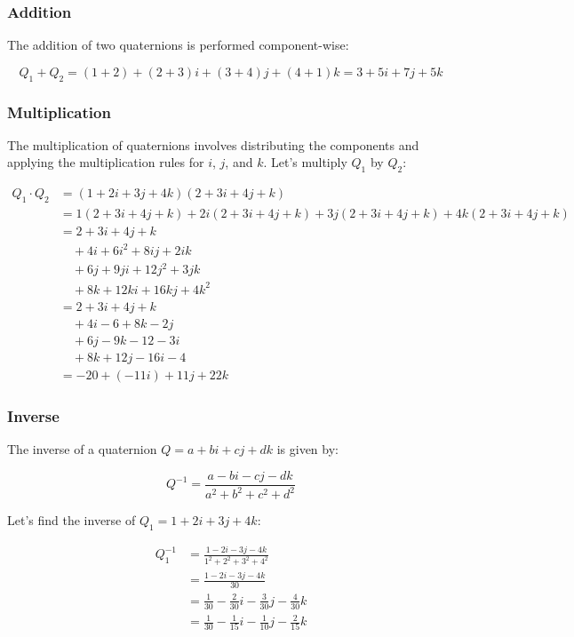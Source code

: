 \documentclass[
]{article}
\begin{document}
\subsubsection{Addition}\label{addition}

The addition of two quaternions is performed component-wise:

\[ Q_1 + Q_2 = (1 + 2) + (2 + 3)i + (3 + 4)j + (4 + 1)k = 3 + 5i + 7j + 5k \]

\subsubsection{Multiplication}\label{multiplication}

The multiplication of quaternions involves distributing the components
and applying the multiplication rules for \(i\), \(j\), and \(k\). Let's
multiply \(Q_1\) by \(Q_2\):


\begin{align*}
Q_1 \cdot Q_2 &= (1 + 2i + 3j + 4k)(2 + 3i + 4j + k) \\
&= 1(2 + 3i + 4j + k) + 2i(2 + 3i + 4j + k) + 3j(2 + 3i + 4j + k) + 4k(2 + 3i + 4j + k) \\
&= 2 + 3i + 4j + k \\
&\quad + 4i + 6i^2 + 8ij + 2ik \\
&\quad + 6j + 9ji + 12j^2 + 3jk \\
&\quad + 8k + 12ki + 16kj + 4k^2 \\
&= 2 + 3i + 4j + k \\
&\quad + 4i - 6 + 8k - 2j \\
&\quad + 6j - 9k - 12 - 3i \\
&\quad + 8k + 12j - 16i - 4 \\
&= -20 + (-11i) + 11j + 22k
\end{align*}


\subsubsection{Inverse}\label{inverse}

The inverse of a quaternion \(Q = a + bi + cj + dk\) is given by:

\[ Q^{-1} = \frac{a - bi - cj - dk}{a^2 + b^2 + c^2 + d^2} \]

Let's find the inverse of \(Q_1 = 1 + 2i + 3j + 4k\):


\begin{align*}
Q_1^{-1} &= \frac{1 - 2i - 3j - 4k}{1^2 + 2^2 + 3^2 + 4^2} \\
&= \frac{1 - 2i - 3j - 4k}{30} \\
&= \frac{1}{30} - \frac{2}{30}i - \frac{3}{30}j - \frac{4}{30}k \\
&= \frac{1}{30} - \frac{1}{15}i - \frac{1}{10}j - \frac{2}{15}k
\end{align*}
\end{document}

